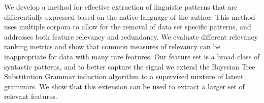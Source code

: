 We develop a method for effective extraction of linguistic patterns that are differentially expressed based on the native language
 of the author.                                                              This
 method
 uses
 multiple
 corpora
 to
 allow
 for the
 removal of data set specific patterns, and addresses both feature
 relevancy and redundancy.  We
 evaluate different relevancy ranking metrics and
 show that common measures of relevancy can be inappropriate for
 data with many rare features.  Our feature set is a broad class of 
 syntactic patterns, and to better capture the signal
 we extend the Bayesian Tree Substitution
 Grammar induction algorithm to a supervised mixture of latent grammars.
 We show that this extension can be used to extract a larger set of relevant
 features.

